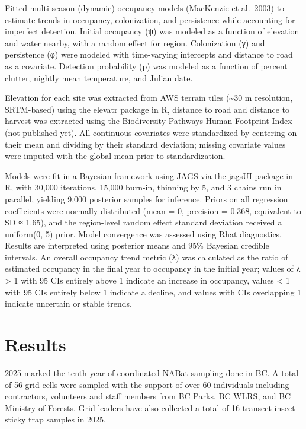 \documentclass[
  letterpaper,
  DIV=11,
  numbers=noendperiod]{scrartcl}
\begin{document}
Fitted multi-season (dynamic) occupancy models (MacKenzie et al.~2003)
to estimate trends in occupancy, colonization, and persistence while
accounting for imperfect detection. Initial occupancy (ψ) was modeled as
a function of elevation and water nearby, with a random effect for
region. Colonization (γ) and persistence (φ) were modeled with
time-varying intercepts and distance to road as a covariate. Detection
probability (p) was modeled as a function of percent clutter, nightly
mean temperature, and Julian date.

Elevation for each site was extracted from AWS terrain tiles
(\textasciitilde30 m resolution, SRTM-based) using the elevatr package
in R, distance to road and distance to harvest was extracted using the
Biodiversity Pathways Human Footprint Index (not published yet). All
continuous covariates were standardized by centering on their mean and
dividing by their standard deviation; missing covariate values were
imputed with the global mean prior to standardization.

Models were fit in a Bayesian framework using JAGS via the jagsUI
package in R, with 30,000 iterations, 15,000 burn-in, thinning by 5, and
3 chains run in parallel, yielding 9,000 posterior samples for
inference. Priors on all regression coefficients were normally
distributed (mean = 0, precision = 0.368, equivalent to SD ≈ 1.65), and
the region-level random effect standard deviation received a uniform(0,
5) prior. Model convergence was assessed using Rhat diagnostics. Results
are interpreted using posterior means and 95\% Bayesian credible
intervals. An overall occupancy trend metric (λ) was calculated as the
ratio of estimated occupancy in the final year to occupancy in the
initial year; values of λ \textgreater{} 1 with 95 CIs entirely above 1
indicate an increase in occupancy, values \textless{} 1 with 95 CIs
entirely below 1 indicate a decline, and values with CIs overlapping 1
indicate uncertain or stable trends.~

\section{Results}\label{results}

2025 marked the tenth year of coordinated NABat sampling done in BC. A
total of 56 grid cells were sampled with the support of over 60
individuals including contractors, volunteers and staff members from BC
Parks, BC WLRS, and BC Ministry of Forests. Grid leaders have also
collected a total of 16 transect insect sticky trap samples in 2025.
\end{document}
